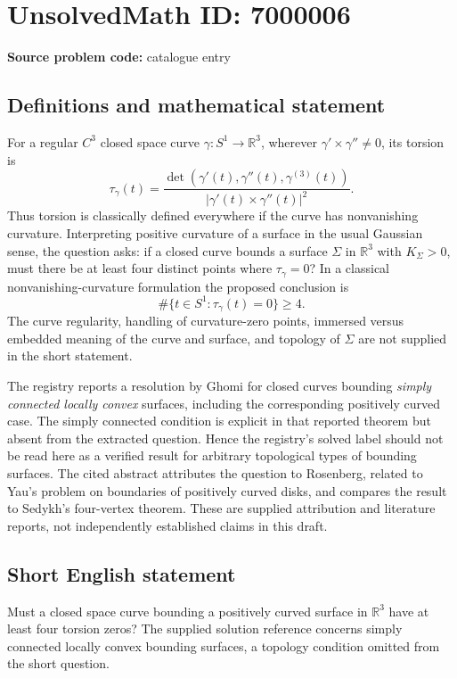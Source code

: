 \documentclass[11pt]{article}
\newcommand{\R}{\mathbb{R}}
\begin{document}
\section*{UnsolvedMath ID: 7000006}
\textbf{Source problem code:} catalogue entry
\subsection{Definitions and mathematical statement}
For a regular \(C^3\) closed space curve \(\gamma:S^1\to\R^3\), wherever \(\gamma'\times\gamma''\ne0\), its torsion is
\[
 \tau_\gamma(t)=\frac{\det(\gamma'(t),\gamma''(t),\gamma^{(3)}(t))}{|\gamma'(t)\times\gamma''(t)|^2}.
\]
Thus torsion is classically defined everywhere if the curve has nonvanishing curvature. Interpreting positive curvature of a surface in the usual Gaussian sense, the question asks: if a closed curve bounds a surface \(\Sigma\) in \(\R^3\) with \(K_\Sigma>0\), must there be at least four distinct points where \(\tau_\gamma=0\)? In a classical nonvanishing-curvature formulation the proposed conclusion is
\[
 \#\{t\in S^1:\tau_\gamma(t)=0\}\geq4.
\]
The curve regularity, handling of curvature-zero points, immersed versus embedded meaning of the curve and surface, and topology of \(\Sigma\) are not supplied in the short statement.

The registry reports a resolution by Ghomi for closed curves bounding \emph{simply connected locally convex} surfaces, including the corresponding positively curved case. The simply connected condition is explicit in that reported theorem but absent from the extracted question. Hence the registry's solved label should not be read here as a verified result for arbitrary topological types of bounding surfaces. The cited abstract attributes the question to Rosenberg, related to Yau's problem on boundaries of positively curved disks, and compares the result to Sedykh's four-vertex theorem. These are supplied attribution and literature reports, not independently established claims in this draft.
\subsection{Short English statement}
Must a closed space curve bounding a positively curved surface in \(\R^3\) have at least four torsion zeros? The supplied solution reference concerns simply connected locally convex bounding surfaces, a topology condition omitted from the short question.
\end{document}
